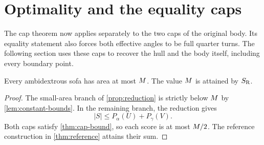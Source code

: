 \section{Optimality and the equality caps}\label{sec:equality}

The cap theorem now applies separately to the two caps of the
original body. Its equality statement also forces both effective
angles to be full quarter turns. The following section uses these caps to recover the hull and the
body itself, including every boundary point.

\begin{theorem}[Optimality]\label{thm:optimality}
Every ambidextrous sofa has area at most $M$. The value $M$ is
attained by $S_{\mathrm R}$.
\end{theorem}

\begin{proof}
The small-area branch of \cref{prop:reduction} is strictly below
$M$ by \cref{lem:constant-bounds}. In the remaining branch, the
reduction gives
\[
 |S|\le P_\alpha(U)+P_\gamma(V).
\]
Both caps satisfy \cref{thm:cap-bound}, so each score is at most
$M/2$. The reference construction in \cref{thm:reference}
attains their sum.
\end{proof}

